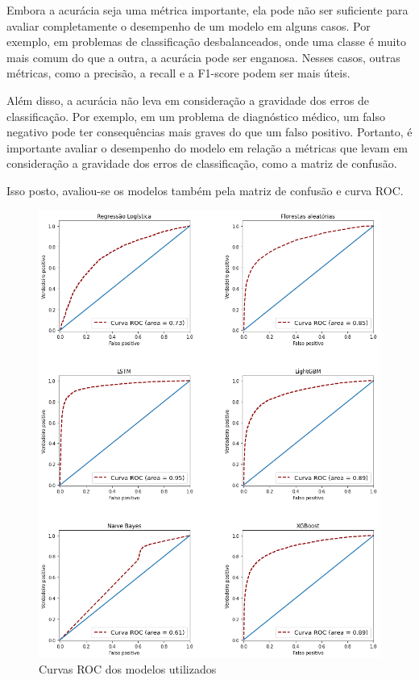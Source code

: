 Embora a acurácia seja uma métrica importante, ela pode não ser suficiente para avaliar completamente o desempenho de um modelo em alguns casos. Por exemplo, em problemas de classificação desbalanceados, onde uma classe é muito mais comum do que a outra, a acurácia pode ser enganosa. Nesses casos, outras métricas, como a precisão, a recall e a F1-score podem ser mais úteis.

Além disso, a acurácia não leva em consideração a gravidade dos erros de classificação. Por exemplo, em um problema de diagnóstico médico, um falso negativo pode ter consequências mais graves do que um falso positivo. Portanto, é importante avaliar o desempenho do modelo em relação a métricas que levam em consideração a gravidade dos erros de classificação, como a matriz de confusão.

Isso posto, avaliou-se os modelos também pela matriz de confusão e curva ROC.


\begin{figure}[H]
    \centering
    \includegraphics[scale=0.6]{./figs/roc_v.png}
    \caption{Curvas ROC dos modelos utilizados}
    \label{fig:roccurve}
\end{figure}

